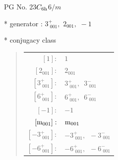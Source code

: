 \documentclass[fleqn,8pt]{jsarticle}
\begin{document}
\setcounter{MaxMatrixCols}{32}

\renewcommand{\tablename}{Table~}
\renewcommand{\figurename}{Figure~}
\begin{center}
\LARGE
PG No. 23\quad$C_{\rm 6h}$\quad$6/m$\quad[ hexagonal ]
\end{center}

* generator : $3^{+}_{\,\,001},\,\,2{}_{001},\,\,-1$

* conjugacy class
\begin{quote}
\begin{tabular}{rl}
$ [1]: $ & $ 1 $ \\
$ [2{}_{001}]: $ & $ 2{}_{001} $ \\
$ [3^{+}_{\,\,001}]: $ & $ 3^{+}_{\,\,001},\,\,\,3^{-}_{\,\,001} $ \\
$ [6^{+}_{\,\,001}]: $ & $ 6^{+}_{\,\,001},\,\,\,6^{-}_{\,\,001} $ \\
$ [-1]: $ & $ -1 $ \\
$ [{\rm m}_{001}]: $ & $ {\rm m}_{001} $ \\
$ [-3^{+}_{\,\,001}]: $ & $ -3^{+}_{\,\,001},\,\,\,-3^{-}_{\,\,001} $ \\
$ [-6^{+}_{\,\,001}]: $ & $ -6^{+}_{\,\,001},\,\,\,-6^{-}_{\,\,001} $
\end{tabular}
\end{quote}
\end{document}
